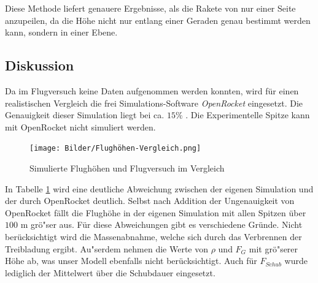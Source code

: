 \documentclass[10pt,a4paper]{article}
\begin{document}
\noindent
Diese Methode liefert genauere Ergebnisse, als die Rakete von nur einer Seite anzupeilen, da die Höhe nicht nur entlang einer Geraden genau bestimmt werden kann, sondern in einer Ebene. 


\subsection{Diskussion}

Da im Flugversuch keine Daten aufgenommen werden konnten, wird für einen realistischen Vergleich die frei Simulations-Software \emph{OpenRocket} eingesetzt. Die Genauigkeit dieser Simulation liegt bei ca. $15 \%$ \cite{sn}. Die Experimentelle Spitze kann mit OpenRocket nicht simuliert werden.


\begin{figure}
	\centering
	\texttt{[image: Bilder/Flughöhen-Vergleich.png]}
	\caption{Simulierte Flughöhen und Flugversuch im Vergleich}
	\label{fig-Simulationsvergleich}
\end{figure}

In Tabelle \ref{fig-Simulationsvergleich} wird eine deutliche Abweichung zwischen der eigenen Simulation und der durch OpenRocket deutlich. Selbst nach Addition der Ungenauigkeit von OpenRocket fällt die Flughöhe in der eigenen Simulation mit allen Spitzen über $100 \text{ m}$ grö"ser aus. Für diese Abweichungen gibt es verschiedene Gründe. Nicht berücksichtigt wird die Massenabnahme, welche sich durch das Verbrennen der Treibladung ergibt. Au"serdem nehmen die Werte von $\rho$ und $F_{G}$ mit grö"serer Höhe ab, was unser Modell ebenfalls nicht berücksichtigt. Auch für $F_{Schub}$ wurde lediglich der Mittelwert über die Schubdauer eingesetzt.
\end{document}

